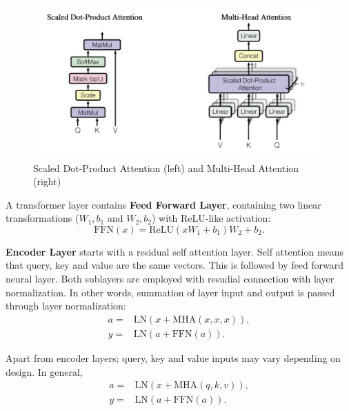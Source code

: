 \begin{figure}
	\centering
	\includegraphics[width=0.98\textwidth]{figures/ml_theory/att.png}
	\caption{Scaled Dot-Product Attention (left) and Multi-Head Attention (right)~\cite{vaswani_attention_2017}}
	\label{fig:att_and_mha}
\end{figure}

A transformer layer contains \textbf{Feed Forward Layer}, containing two linear transformations ($W_1, b_1$ and $W_2, b_2$) with ReLU-like activation:
\begin{equation}
\mathrm{FFN}(x) = \text{ReLU}(x W_1 + b_1) W_2 + b_2.
\end{equation}

\textbf{Encoder Layer} starts with a residual self attention layer. 
Self attention means that query, key and value are the same vectors. 
This is followed by feed forward neural layer. 
Both sublayers are employed with resudial connection with layer normalization.
In other words, summation of layer input and output is passed through layer normalization: 
\begin{equation}
\begin{split}
a = & \mathrm{LN}(x + \mathrm{MHA}(x,x,x)), \\
y = & \mathrm{LN}(a + \mathrm{FFN}(a)).
\end{split}
\end{equation}

Apart from encoder layers; query, key and value inputs may vary depending on design. In general,
\begin{equation}
\begin{split}
a = & \mathrm{LN}(x + \mathrm{MHA}(q,k,v)), \\
y = & \mathrm{LN}(a + \mathrm{FFN}(a)).
\end{split}
\end{equation}

